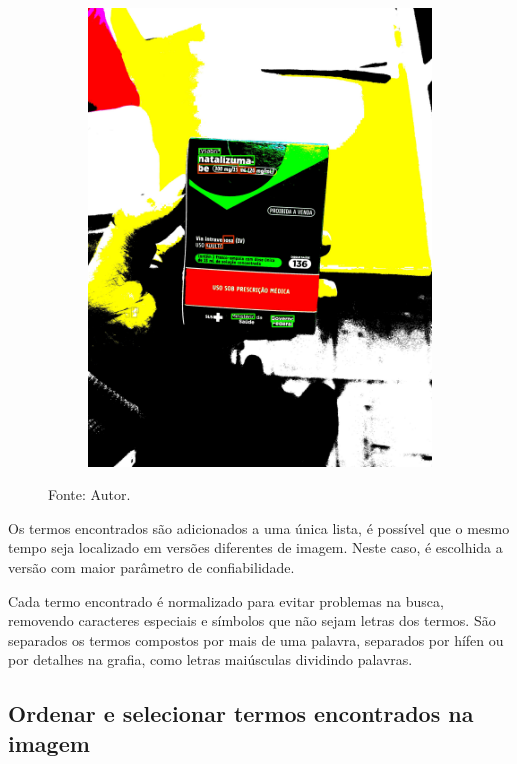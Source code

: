 \begin{figure}[htb]
\begin{subfigure}[b]{0.21\textwidth}
        \includegraphics[width=\linewidth]{../pictures/tysabri_rgb_thresh_recomposed_cmyk_boxes.jpg}
    \end{subfigure}
    \caption*{Fonte: Autor.}
    \label{fig:foto:versoes:3}
\end{figure}

Os termos encontrados são adicionados a uma única lista, é possível que o mesmo tempo seja localizado em versões diferentes de imagem. Neste caso, é escolhida a versão com maior parâmetro de confiabilidade.

Cada termo encontrado é normalizado para evitar problemas na busca, removendo caracteres especiais e símbolos que não sejam letras dos termos.
São separados os termos compostos por mais de uma palavra, separados por hífen ou por detalhes na grafia, como letras maiúsculas dividindo palavras.

\subsection{Ordenar e selecionar termos encontrados na imagem}\label{ssec:organizar}

